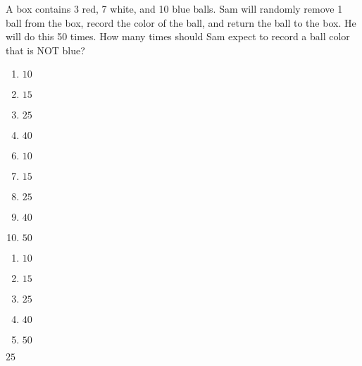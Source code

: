 A box contains 3 red, 7 white, and 10 blue balls. Sam will randomly remove 1 ball from the box, record the color of the ball, and return the ball to the box. He will do this 50 times. How many times should Sam expect to record a ball color that is NOT blue? 

\ifsat
	\begin{enumerate}[label=\Alph*)]
		\item   $10$
		\item  $15$ 
		\item  $25$ %
		\item  $40$ 
	\end{enumerate}
\else
\fi

\ifacteven
	\begin{enumerate}[label=\textbf{\Alph*.},itemsep=\fill,align=left]
		\setcounter{enumii}{5}
		\item   $10$
		\item  $15$ 
		\item  $25$ %
		\addtocounter{enumii}{1}
		\item  $40$ 
		\item  $50$  
	\end{enumerate}
\else
\fi

\ifactodd
	\begin{enumerate}[label=\textbf{\Alph*.},itemsep=\fill,align=left]
		\item   $10$
		\item  $15$ 
		\item  $25$ %
		\item  $40$ 
		\item  $50$ 
	\end{enumerate}
\else
\fi

\ifgridin
  $25$ %
		
\else
\fi

